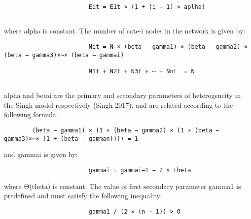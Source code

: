 \documentclass[11pt]{article}
\begin{document}
\begin{verbatim}
                        Eit = E1t × (1 + (i − 1) × aplha)
                        
\end{verbatim}

where alpha is constant. The number of cate-i nodes in the network is
given by:

\begin{verbatim}
                        Nit = N × (beta − gamma1) × (beta − gamma2) × (beta − gamma3)×⋯× (beta − gammai)
                        
                        N1t + N2t + N3t + ⋯ + Nnt  = N
                        
\end{verbatim}

alpha and betai are the primary and secondary parameters of
heterogeneity in the Singh model respectively (Singh 2017), and are
related according to the following formula:

\begin{verbatim}
        (beta − gamma1) × (1 + (beta − gamma2) × (1 + (beta − gamma3)×⋯× (1 + (beta − gamman)))) = 1
\end{verbatim}

and gammai is given by:

\begin{verbatim}
                        gammai = gammai−1 − 2 × theta
\end{verbatim}

where Θ(theta) is constant. The value of first secondary parameter
gamma1 is predefined and must satisfy the following inequality:

\begin{verbatim}
                        gamma1 / (2 × (n − 1)) > Θ
\end{verbatim}
\end{document}
